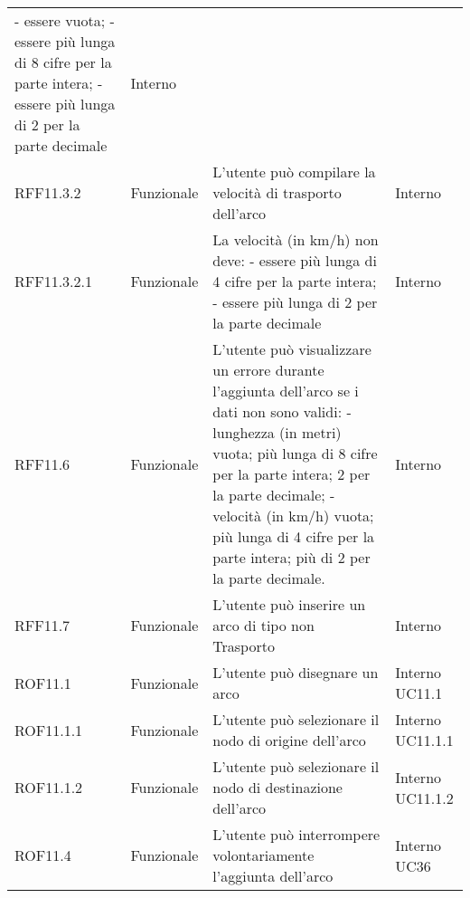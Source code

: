 \begin{longtable}{p{2cm}!{\VRule[1pt]}p{2cm}!{\VRule[1pt]}p{5cm}!{\VRule[1pt]}p{1.5cm}}
	- essere vuota;
	- essere più lunga di 8 cifre per la parte intera; 
	- essere più lunga di 2 per la parte decimale & Interno \\
	RFF11.3.2                        & Funzionale\newline               & L'utente può compilare la velocità  di trasporto dell'arco                                                              & Interno                      \\
	RFF11.3.2.1&Funzionale\newline  & La velocità (in km/h) non deve:
	- essere più lunga di 4 cifre per la parte intera;
	- essere più lunga di 2 per la parte decimale & Interno \\
	RFF11.6&Funzionale\newline  & L'utente può visualizzare un errore durante l'aggiunta dell'arco se i dati non sono validi:
	- lunghezza (in metri) vuota; più lunga di 8 cifre per la parte intera; 2 per la parte decimale;
	- velocità (in km/h) vuota; più lunga di 4 cifre per la parte intera; più di 2 per la parte decimale. & Interno \\
	RFF11.7                          & Funzionale\newline               & L'utente può inserire un arco di tipo non Trasporto                                                                      & Interno                      \\
	ROF11.1                          & Funzionale\newline               & L'utente può disegnare un arco                                                                                           & Interno \newline UC11.1      
	\\
	ROF11.1.1                        & Funzionale\newline               & L'utente può selezionare il nodo di origine dell'arco                                                                    & Interno \newline UC11.1.1    
	\\
	ROF11.1.2                        & Funzionale\newline               & L'utente può selezionare il nodo di destinazione dell'arco                                                               & Interno \newline UC11.1.2    
	\\
	ROF11.4                          & Funzionale\newline               & L'utente può interrompere volontariamente l'aggiunta dell'arco                                                           & Interno \newline UC36        

\end{longtable}
